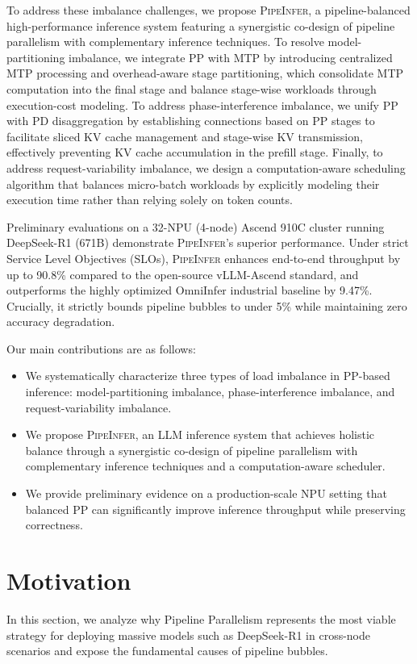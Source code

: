 \documentclass[12pt,a4paper]{article}
\newcommand{\sys}{\textsc{PipeInfer}\xspace}
\newcommand{\prefillterm}{prefill\xspace}
\newcommand{\kvcache}{KV cache\xspace}
\newcommand{\modelimb}{model-partitioning imbalance\xspace}
\newcommand{\phaseimb}{phase-interference imbalance\xspace}
\newcommand{\requestimb}{request-variability imbalance\xspace}
\newcommand{\centralmtp}{centralized MTP processing\xspace}
\newcommand{\overheadpartition}{overhead-aware stage partitioning\xspace}
\newcommand{\slicedkv}{sliced KV cache management\xspace}
\newcommand{\stagekv}{stage-wise KV transmission\xspace}
\newcommand{\timesched}{computation-aware scheduling\xspace}
\newcommand{\clusterconfig}{32-NPU (4-node) Ascend 910C cluster\xspace}
\newcommand{\vllmgain}{90.8\%\xspace}
\newcommand{\omnigain}{9.47\%\xspace}
\newcommand{\bubblecap}{5\%\xspace}
\begin{document}
To address these imbalance challenges, we propose \sys, a pipeline-balanced high-performance inference system featuring a synergistic co-design of pipeline parallelism with complementary inference techniques.
To resolve \modelimb, we integrate PP with MTP by introducing \centralmtp and \overheadpartition, which consolidate MTP computation into the final stage and balance stage-wise workloads through execution-cost modeling.
To address \phaseimb, we unify PP with PD disaggregation by establishing connections based on PP stages to facilitate \slicedkv and \stagekv, effectively preventing \kvcache accumulation in the \prefillterm stage.
Finally, to address \requestimb, we design a \timesched algorithm that balances micro-batch workloads by explicitly modeling their execution time rather than relying solely on token counts.

Preliminary evaluations on a \clusterconfig running DeepSeek-R1 (671B) demonstrate \sys's superior performance.
Under strict Service Level Objectives (SLOs), \sys enhances end-to-end throughput by up to \vllmgain compared to the open-source vLLM-Ascend standard, and outperforms the highly optimized OmniInfer industrial baseline by \omnigain.
Crucially, it strictly bounds pipeline bubbles to under \bubblecap while maintaining zero accuracy degradation.

Our main contributions are as follows:
\begin{itemize}[leftmargin=*]
    \item We systematically characterize three types of load imbalance in PP-based inference: \modelimb, \phaseimb, and \requestimb.
    \item We propose \sys, an LLM inference system that achieves holistic balance through a synergistic co-design of pipeline parallelism with complementary inference techniques and a computation-aware scheduler.
    \item We provide preliminary evidence on a production-scale NPU setting that balanced PP can significantly improve inference throughput while preserving correctness.
\end{itemize}

\section{Motivation}
\label{sec:moti}

In this section, we analyze why Pipeline Parallelism represents the most viable strategy for deploying massive models such as DeepSeek-R1 in cross-node scenarios and expose the fundamental causes of pipeline bubbles.
\end{document}
